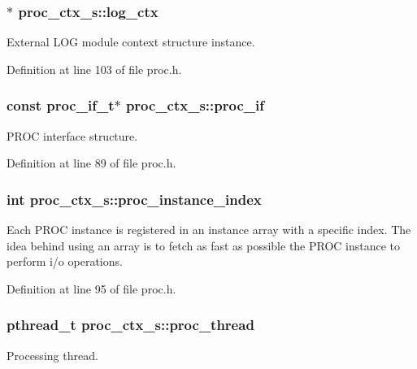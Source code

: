 \subsubsection[{\texorpdfstring{log\+\_\+ctx}{log_ctx}}]{$\ast$ proc\+\_\+ctx\+\_\+s\+::log\+\_\+ctx}\hypertarget{structproc__ctx__s_a7c58dee78b4d7834e4c2fe430cd267d5}{}\label{structproc__ctx__s_a7c58dee78b4d7834e4c2fe430cd267d5}
External L\+OG module context structure instance. 

Definition at line 103 of file proc.\+h.

\subsubsection[{\texorpdfstring{proc\+\_\+if}{proc_if}}]{\setlength{\rightskip}{0pt plus 5cm}const {\bf proc\+\_\+if\+\_\+t}$\ast$ proc\+\_\+ctx\+\_\+s\+::proc\+\_\+if}\hypertarget{structproc__ctx__s_ae63f720fef21f807ed42fe76806140f6}{}\label{structproc__ctx__s_ae63f720fef21f807ed42fe76806140f6}
P\+R\+OC interface structure. 

Definition at line 89 of file proc.\+h.

\subsubsection[{\texorpdfstring{proc\+\_\+instance\+\_\+index}{proc_instance_index}}]{\setlength{\rightskip}{0pt plus 5cm}int proc\+\_\+ctx\+\_\+s\+::proc\+\_\+instance\+\_\+index}\hypertarget{structproc__ctx__s_a3912d4b5eaffcdaefa00f149ca4a8c63}{}\label{structproc__ctx__s_a3912d4b5eaffcdaefa00f149ca4a8c63}
Each P\+R\+OC instance is registered in an instance array with a specific index. The idea behind using an array is to fetch as fast as possible the P\+R\+OC instance to perform i/o operations. 

Definition at line 95 of file proc.\+h.

\subsubsection[{\texorpdfstring{proc\+\_\+thread}{proc_thread}}]{\setlength{\rightskip}{0pt plus 5cm}pthread\+\_\+t proc\+\_\+ctx\+\_\+s\+::proc\+\_\+thread}\hypertarget{structproc__ctx__s_a09ad60355584215cfeb4d5589ee390b9}{}\label{structproc__ctx__s_a09ad60355584215cfeb4d5589ee390b9}
Processing thread. 

